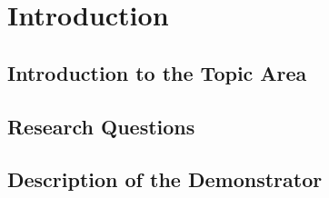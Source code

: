 \chapter{Introduction}
\label{cha:introduction}



\section{Introduction to the Topic Area}


\section{Research Questions}




\section{Description of the Demonstrator}

